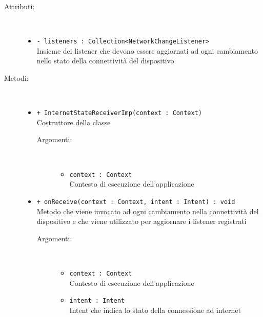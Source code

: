 \documentclass[../Tesi.tex]{subfiles}
\begin{document}
		\begin{description}
			\item[Attributi:] \
			\begin{itemize}
				\item \texttt{- listeners : Collection<NetworkChangeListener>}\\
				Insieme dei listener che devono essere aggiornati ad ogni cambiamento nello stato della connettività del dispositivo
			\end{itemize}

			\item[Metodi:] \
			\begin{itemize}
				\item \texttt{+ InternetStateReceiverImp(context : Context)}\\
				Costruttore della classe 
				\begin{description}
					\item[Argomenti:] \
					\begin{itemize}
						\item \texttt{context : Context}\\
						Contesto di esecuzione dell'applicazione
					\end{itemize}
				\end{description}

				\item \texttt{+ onReceive(context : Context, intent : Intent) : void}\\
				Metodo che viene invocato ad ogni cambiamento nella connettività del dispositivo e che viene utilizzato per aggiornare i listener registrati
				\begin{description}
					\item[Argomenti:] \
					\begin{itemize}
						\item \texttt{context : Context}\\
						Contesto di esecuzione dell'applicazione

						\item \texttt{intent : Intent}\\
						Intent che indica lo stato della connessione ad internet
					\end{itemize}
				\end{description}


\end{itemize}
\end{description}
\end{document}
